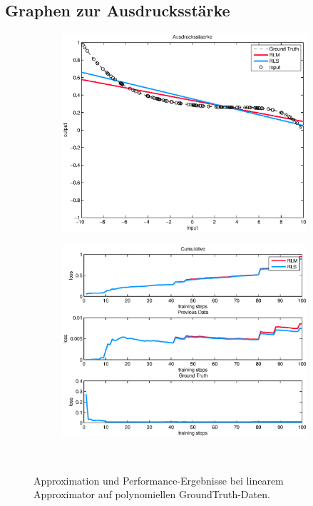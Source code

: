 \documentclass[a4paper, 12pt]{article}
\begin{document}
{\subsection{Graphen zur Ausdrucksstärke}
\label{apx:ausdruck}
\begin{figure}[H]
        \centering
        \begin{subfigure}[b]{0.4\textwidth}
                \centering
                \includegraphics[width=\textwidth]{./images/copyofstats/ausdruck1_approx_100poly.eps}
                \caption{}
                \label{fig:apx:ausdruck:ausdruck11}
        \end{subfigure}
        \begin{subfigure}[b]{0.4\textwidth}
                \centering
                \includegraphics[width=\textwidth]{./images/copyofstats/ausdruck1_perf_100poly.eps}
                \caption{}
                \label{fig:apx:ausdruck:perf11}
        \end{subfigure}
        \\
        \caption{Approximation und Performance-Ergebnisse bei linearem Approximator auf polynomiellen GroundTruth-Daten.}
        \label{fig:apx:ausdruck1}
\end{figure}

}
\end{document}
